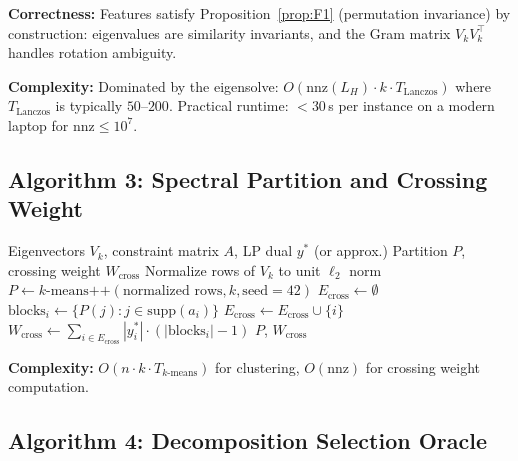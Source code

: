 \documentclass[12pt]{article}
\begin{document}
\textbf{Correctness:} Features satisfy Proposition~\ref{prop:F1}
(permutation invariance) by construction: eigenvalues are similarity
invariants, and the Gram matrix $V_k V_k^\top$ handles rotation ambiguity.

\textbf{Complexity:} Dominated by the eigensolve:
$O(\mathrm{nnz}(L_H) \cdot k \cdot T_{\mathrm{Lanczos}})$ where
$T_{\mathrm{Lanczos}}$ is typically $50$--$200$.  Practical runtime:
$< 30$\,s per instance on a modern laptop for $\mathrm{nnz} \leq 10^7$.

\subsection{Algorithm 3: Spectral Partition and Crossing Weight}

\begin{algorithm}[ht]
\caption{Spectral Partition and L3 Bound Computation}
\label{alg:partition}
\begin{algorithmic}[1]
\Require Eigenvectors $V_k$, constraint matrix $A$, LP dual $y^*$ (or approx.)
\Ensure Partition $P$, crossing weight $W_{\mathrm{cross}}$
\State Normalize rows of $V_k$ to unit $\ell_2$ norm
\State $P \gets k\text{-means++}(\text{normalized rows}, k, \text{seed}=42)$
\State $E_{\mathrm{cross}} \gets \emptyset$
  \State $\mathrm{blocks}_i \gets \{P(j) : j \in \mathrm{supp}(a_i)\}$
    \State $E_{\mathrm{cross}} \gets E_{\mathrm{cross}} \cup \{i\}$
  \EndIf
\EndFor
\State $W_{\mathrm{cross}} \gets \sum_{i \in E_{\mathrm{cross}}} |y_i^*| \cdot (|\mathrm{blocks}_i| - 1)$
\State \Return $P$, $W_{\mathrm{cross}}$
\end{algorithmic}
\end{algorithm}

\textbf{Complexity:} $O(n \cdot k \cdot T_{k\text{-means}})$ for clustering,
$O(\mathrm{nnz})$ for crossing weight computation.

\subsection{Algorithm 4: Decomposition Selection Oracle}
\end{document}
